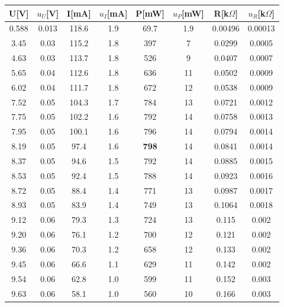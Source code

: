 \documentclass[12pt,a4paper]{article}
\begin{document}
\begin{table}[H]
    \centering
    \begin{tabular}{|c|c|c|c|c|c|c|c|}
    \hline
    U{[}V{]} & $u_U$[V] & I{[}mA{]} & $u_I$[mA] & P[mW] & $u_P$[mW] & R[k$\Omega$] & $u_R$[k$\Omega$] \\ \hline
    0.588    & 0.013 & 118.6     & 1.9 & 69.7 & 1.9 & 0.00496 & 0.00013 \\ \hline
    3.45     & 0.03  & 115.2     & 1.8 & 397  & 7   & 0.0299 & 0.0005 \\ \hline
    4.63     & 0.03  & 113.7     & 1.8 & 526  & 9   & 0.0407 & 0.0007 \\ \hline
    5.65     & 0.04  & 112.6     & 1.8 & 636  & 11  & 0.0502 & 0.0009 \\ \hline
    6.02     & 0.04  & 111.7     & 1.8 & 672  & 12  & 0.0538 & 0.0009 \\ \hline
    7.52     & 0.05  & 104.3     & 1.7 & 784  & 13  & 0.0721 & 0.0012 \\ \hline
    7.75     & 0.05  & 102.2     & 1.6 & 792  & 14  & 0.0758 & 0.0013 \\ \hline
    7.95     & 0.05  & 100.1     & 1.6 & 796  & 14  & 0.0794 & 0.0014 \\ \hline
    8.19     & 0.05  & 97.4      & 1.6 & \textbf{798}  & 14  & 0.0841 & 0.0014 \\ \hline
    8.37     & 0.05  & 94.6      & 1.5 & 792  & 14  & 0.0885 & 0.0015 \\ \hline
    8.53     & 0.05  & 92.4      & 1.5 & 788  & 14  & 0.0923 & 0.0016 \\ \hline
    8.72     & 0.05  & 88.4      & 1.4 & 771  & 13  & 0.0987 & 0.0017 \\ \hline
    8.93     & 0.05  & 83.9      & 1.4 & 749  & 13  & 0.1064 & 0.0018 \\ \hline
    9.12     & 0.06  & 79.3      & 1.3 & 724  & 13  & 0.115  & 0.002  \\ \hline
    9.20     & 0.06  & 76.1      & 1.2 & 700  & 12  & 0.121  & 0.002  \\ \hline
    9.36     & 0.06  & 70.3      & 1.2 & 658  & 12  & 0.133  & 0.002  \\ \hline
    9.45     & 0.06  & 66.6      & 1.1 & 629  & 11  & 0.142  & 0.002  \\ \hline
    9.54     & 0.06  & 62.8      & 1.0 & 599  & 11  & 0.152  & 0.003  \\ \hline
    9.63     & 0.06  & 58.1      & 1.0 & 560  & 10  & 0.166  & 0.003  \\ \hline

\end{tabular}
\end{table}
\end{document}
